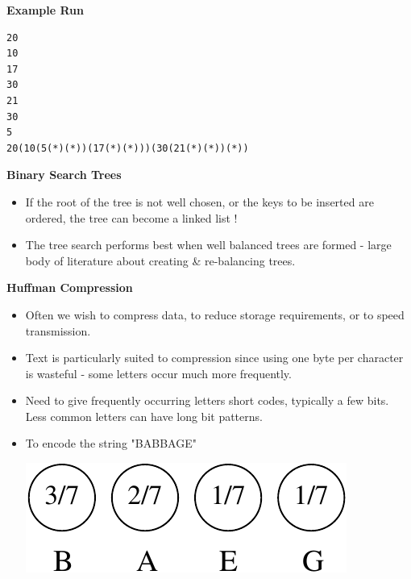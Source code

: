 \documentclass[a4,portraitt]{slides}
\begin{document}
\newpage
{\samepage
\begin{center}
{\Large{\bf Example Run}}
\end{center}
\begin{verbatim}
20
10
17
30
21
30
5
20(10(5(*)(*))(17(*)(*)))(30(21(*)(*))(*))
\end{verbatim}
}

\newpage
{\samepage
\begin{center}
{\Large{\bf Binary Search Trees}}
\end{center}
\begin{itemize}
\item  If the root of the tree is not well chosen, or the keys to be inserted are ordered, the tree can become a linked list !
\item The tree search performs best when well balanced trees are formed - large
body of literature about creating \& re-balancing trees.
\end{itemize}
}


\newpage
{\samepage
\begin{center}
{\Large{\bf Huffman Compression}}
\end{center}
\begin{itemize}
\item Often we wish to compress data, to reduce storage requirements, or to speed transmission.
\item  Text is particularly suited to compression since using one byte per character is wasteful - some letters occur much more frequently.
\item  Need to give frequently occurring letters short codes, typically a few bits. Less common letters can have long bit patterns.
\item To encode the string "BABBAGE"
\begin{center}
\includegraphics{../Images/huff1.pdf}
\end{center}
\end{itemize}
}
\end{document}
